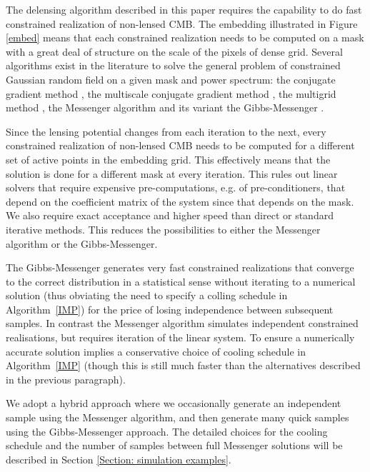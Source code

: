 \documentclass[iop,revtex4,apj,onecolumn]{emulateapj}
\begin{document}
The delensing algorithm described in this paper requires the capability to do fast constrained realization of non-lensed CMB. The embedding illustrated in Figure \ref{embed} means that each constrained realization needs to be computed on a mask with a great deal of structure on the scale of the pixels of dense grid. Several algorithms exist in the literature to solve  the general problem of constrained Gaussian random field on a given mask and power spectrum: the conjugate gradient method \citep{wandelt2004cg,eriksen2004cg}, the multiscale conjugate gradient method \citep{smith2007mcg}, the multigrid method \citep{seljebotn2014mg}, the Messenger algorithm \citep{elsner2013efficient} and its variant the Gibbs-Messenger \citep{jasche2014matrix}. 

Since the lensing potential changes from each iteration to the next, every constrained realization of non-lensed CMB needs to be computed for a different set of active points in the embedding grid. This effectively means that the solution is done for a different mask at every iteration.  This rules out linear solvers that require expensive pre-computations, e.g. of pre-conditioners, that depend on the coefficient matrix of the system since that depends on the mask. We also require  exact acceptance and higher speed than direct or standard iterative methods. This reduces the possibilities to either the Messenger algorithm or the Gibbs-Messenger.  

The Gibbs-Messenger generates very fast constrained realizations that converge to the correct distribution in a statistical sense without iterating to a numerical solution (thus obviating the need to specify a colling schedule in Algorithm~\ref{IMP}) for the price of losing independence between subsequent samples. In contrast the Messenger algorithm simulates independent constrained realisations, but requires iteration of the linear system. To ensure a numerically accurate solution implies a conservative choice of cooling schedule  in Algorithm~\ref{IMP} (though this is still much faster than the alternatives described in the previous paragraph). 

We adopt a hybrid approach where we occasionally generate an independent sample  using the Messenger algorithm, and then generate many quick samples using the Gibbs-Messenger approach. The detailed choices for the cooling schedule and the number of samples between  full Messenger solutions will be described in Section \ref{Section: simulation examples}.
\end{document}
